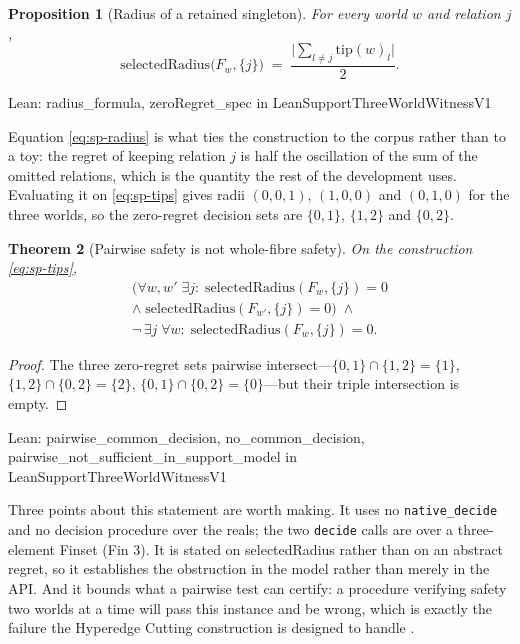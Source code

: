 \documentclass[conference]{IEEEtran}
\newtheorem{theorem}{Theorem}
\newtheorem{proposition}[theorem]{Proposition}
\theoremstyle{definition}
\newcommand{\lean}[1]{\textsf{\footnotesize #1}}
\newcommand{\leanbox}[1]{%
  \par\vspace{2pt}\noindent
  {\footnotesize\textsf{Lean: #1}}\par\vspace{2pt}}
\begin{document}
\begin{proposition}[Radius of a retained singleton]
\label{prop:sp-radius}
For every world $w$ and relation $j$,
\begin{equation}
\mathrm{selectedRadius}\bigl(F_{w},\{j\}\bigr)
\;=\;\frac{\bigl|\sum_{l\neq j}\mathrm{tip}(w)_{l}\bigr|}{2}.
\label{eq:sp-radius}
\end{equation}
\end{proposition}

\leanbox{\lean{radius\_formula}, \lean{zeroRegret\_spec} in
\lean{LeanSupportThreeWorldWitnessV1}}

Equation \eqref{eq:sp-radius} is what ties the construction to the corpus rather than to a toy:
the regret of keeping relation $j$ is half the oscillation of the sum of the omitted
relations, which is the quantity the rest of the development uses. Evaluating it on
\eqref{eq:sp-tips} gives radii $(0,0,1)$, $(1,0,0)$ and $(0,1,0)$ for the three worlds, so the
zero-regret decision sets are $\{0,1\}$, $\{1,2\}$ and $\{0,2\}$.

\begin{theorem}[Pairwise safety is not whole-fibre safety]
\label{thm:sp-threeworld}
On the construction \eqref{eq:sp-tips},
\begin{multline}
\bigl(\forall w,w'\;\exists j:\;
 \mathrm{selectedRadius}(F_{w},\{j\})=0 \\ \wedge\;
 \mathrm{selectedRadius}(F_{w'},\{j\})=0\bigr)
\;\wedge\;\\
\neg\,\exists j\;\forall w:\;\mathrm{selectedRadius}(F_{w},\{j\})=0 .
\label{eq:sp-threeworld}
\end{multline}
\end{theorem}

\begin{proof}
The three zero-regret sets pairwise intersect---$\{0,1\}\cap\{1,2\}=\{1\}$,
$\{1,2\}\cap\{0,2\}=\{2\}$, $\{0,1\}\cap\{0,2\}=\{0\}$---but their triple intersection is
empty.
\end{proof}

\leanbox{\lean{pairwise\_common\_decision}, \lean{no\_common\_decision},
\lean{pairwise\_not\_sufficient\_in\_support\_model} in
\lean{LeanSupportThreeWorldWitnessV1}}

Three points about this statement are worth making. It uses no \texttt{native\_decide} and no
decision procedure over the reals; the two \texttt{decide} calls are over a three-element
\lean{Finset (Fin 3)}. It is stated on \lean{selectedRadius} rather than on an abstract
regret, so it establishes the obstruction in the model rather than merely in the API. And it
bounds what a pairwise test can certify: a procedure verifying safety two worlds at a time
will pass this instance and be wrong, which is exactly the failure the Hyperedge Cutting
construction is designed to handle \cite{javdani2014}.
\end{document}
